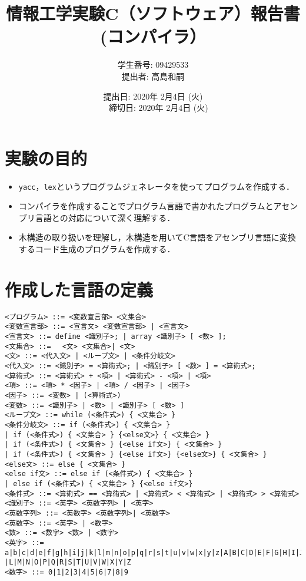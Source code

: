 \documentclass{jarticle}[11pt]
\title{{\normalsize 情報工学実験C（ソフトウェア）報告書}\\
    (コンパイラ）\\
    }
\author{ 
      学生番号: 09429533 \\
      提出者: 高島和嗣
    }
\date{
      提出日: 2020年 2月4日 (火) \\　%
      締切日: 2020年 2月4日 (火)
    }
\begin{document}
    \maketitle
\section{実験の目的}
\begin{itemize}
\item \verb|yacc|，\verb|lex|というプログラムジェネレータを使ってプログラムを作成する．
\item コンパイラを作成することでプログラム言語で書かれたプログラムとアセンブリ言語との対応について深く理解する．
\item 木構造の取り扱いを理解し，木構造を用いてC言語をアセンブリ言語に変換するコード生成のプログラムを作成する．
\end{itemize}

\section{作成した言語の定義}
\begin{verbatim}
<プログラム> ::= <変数宣言部> <文集合>
<変数宣言部> ::= <宣言文> <変数宣言部> | <宣言文>
<宣言文> ::= define <識別子>; | array <識別子> [ <数> ];
<文集合> ::= 　<文> <文集合>| <文>
<文> ::= <代入文> | <ループ文> | <条件分岐文>
<代入文> ::= <識別子> = <算術式>; | <識別子> [ <数> ] = <算術式>;
<算術式> ::= <算術式> + <項> | <算術式> - <項> | <項>
<項> ::= <項> * <因子> | <項> / <因子> | <因子>
<因子> ::= <変数> | (<算術式>)
<変数> ::= <識別子> | <数> | <識別子> [ <数> ]
<ループ文> ::= while (<条件式>) { <文集合> }
<条件分岐文> ::= if (<条件式>) { <文集合> } 
| if (<条件式>) { <文集合> } {<else文>} { <文集合> } 
| if (<条件式>) { <文集合> } {<else if文>} { <文集合> } 
| if (<条件式>) { <文集合> } {<else if文>} {<else文>} { <文集合> } 
<else文> ::= else { <文集合> }
<else if文> ::= else if (<条件式>) { <文集合> } 
| else if (<条件式>) { <文集合> } {<else if文>}
<条件式> ::= <算術式> == <算術式> | <算術式> < <算術式> | <算術式> > <算術式> 
<識別子> ::= <英字> <英数字列> | <英字>
<英数字列> ::= <英数字> <英数字列>| <英数字>
<英数字> ::= <英字> | <数字>
<数> ::= <数字> <数> | <数字>
<英字> ::= a|b|c|d|e|f|g|h|i|j|k|l|m|n|o|p|q|r|s|t|u|v|w|x|y|z|A|B|C|D|E|F|G|H|I|J|K
|L|M|N|O|P|Q|R|S|T|U|V|W|X|Y|Z
<数字> ::= 0|1|2|3|4|5|6|7|8|9
\end{verbatim}

\end{document}
